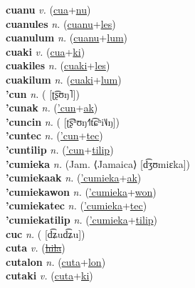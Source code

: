 \textbf{cuanu} \textit{v.} (\hyperref[cua]{cua}+\hyperref[nu]{nu})
 \label{cuanu} \\
\textbf{cuanules} \textit{n.} (\hyperref[cuanu]{cuanu}+\hyperref[les]{les})
 \label{cuanules} \\
\textbf{cuanulum} \textit{n.} (\hyperref[cuanu]{cuanu}+\hyperref[lum]{lum})
 \label{cuanulum} \\
\textbf{cuaki} \textit{v.} (\hyperref[cua]{cua}+\hyperref[ki]{ki})
 \label{cuaki} \\
\textbf{cuakiles} \textit{n.} (\hyperref[cuaki]{cuaki}+\hyperref[les]{les})
 \label{cuakiles} \\
\textbf{cuakilum} \textit{n.} (\hyperref[cuaki]{cuaki}+\hyperref[lum]{lum})
 \label{cuakilum} \\
\textbf{'cun} \textit{n.} ( [ʈ͡ʂʊŋ˥])
 \label{'cun} \\
\textbf{'cunak} \textit{n.} (\hyperref['cun]{'cun}+\hyperref[ak]{ak})
 \label{'cunak} \\
\textbf{'cuncin} \textit{n.} ( [ʈ͡ʂʰʊŋ˧˥t͡ɕʰi˥˩ŋ])
 \label{'cuncin} \\
\textbf{'cuntec} \textit{n.} (\hyperref['cun]{'cun}+\hyperref[tec]{tec})
 \label{'cuntec} \\
\textbf{'cuntilip} \textit{n.} (\hyperref['cun]{'cun}+\hyperref[tilip]{tilip})
 \label{'cuntilip} \\
\textbf{'cumieka} \textit{n.} (Jam. ⟨Jamaica⟩ [d͡ʒʊmiɛka])
 \label{'cumieka} \\
\textbf{'cumiekaak} \textit{n.} (\hyperref['cumieka]{'cumieka}+\hyperref[ak]{ak})
 \label{'cumiekaak} \\
\textbf{'cumiekawon} \textit{n.} (\hyperref['cumieka]{'cumieka}+\hyperref[won]{won})
 \label{'cumiekawon} \\
\textbf{'cumiekatec} \textit{n.} (\hyperref['cumieka]{'cumieka}+\hyperref[tec]{tec})
 \label{'cumiekatec} \\
\textbf{'cumiekatilip} \textit{n.} (\hyperref['cumieka]{'cumieka}+\hyperref[tilip]{tilip})
 \label{'cumiekatilip} \\
\textbf{cuc} \textit{n.} ( [d͡ʑud͡ʑu])
 \label{cuc} \\
\textbf{cuta} \textit{v.} (\hyperref[hila]{\sout{hila}})
 \label{cuta} \\
\textbf{cutalon} \textit{n.} (\hyperref[cuta]{cuta}+\hyperref[lon]{lon})
 \label{cutalon} \\
\textbf{cutaki} \textit{v.} (\hyperref[cuta]{cuta}+\hyperref[ki]{ki})
 \label{cutaki} \\
